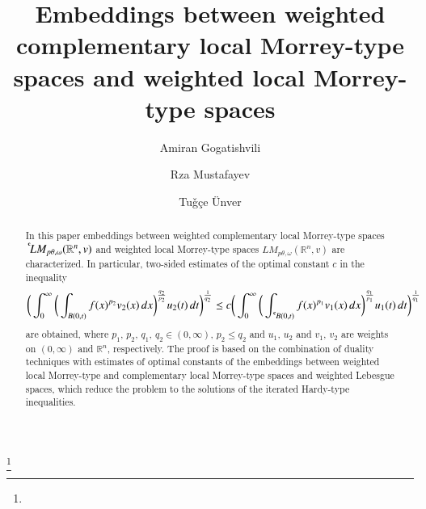 \documentclass[11pt]{amsart}
\theoremstyle{plain}
\theoremstyle{definition}
\numberwithin{thm}{section}
\numberwithin{equation}{section}
\begin{document}
\title[Embeddings between ${{\,^{^{\bf c}}\!}{LM_{p{\theta},{\omega}}({{\mathbb R}^n},v)}}$ and ${LM_{p{\theta},{\omega}}({{\mathbb R}^n},v)}$]{Embeddings between weighted complementary local Morrey-type spaces and weighted local Morrey-type spaces}

\author[A. Gogatishvili]{Amiran Gogatishvili}
\address{Institute of Mathematics \\
    Academy of Sciences of the Czech Republic \\
    \v Zitn\'a~25 \\
    115~67 Praha~1, Czech Republic} 

\author[R.Ch.Mustafayev]{Rza Mustafayev}
\address{Department of Mathematics \\ Faculty of Science and Arts \\ Kirikkale
    University \\ 71450 Yahsihan, Kirikkale, Turkey}

\author[T.~{\"U}nver]{Tu\v{g}\c{c}e {\"U}nver}
\address{Department of Mathematics \\ Faculty of Science and Arts \\ Kirikkale
    University \\ 71450 Yahsihan, Kirikkale, Turkey}

\thanks{}



\begin{abstract}
	In this paper embeddings between  weighted complementary local Morrey-type spaces ${\,^{^{\bf c}}\!}LM_{p\theta,\omega}({\mathbb R}^n,v)$ and  weighted local Morrey-type spaces $LM_{p\theta,\omega}({\mathbb R}^n,v)$ are characterized. In particular, two-sided estimates of the optimal constant $c$ in the inequality
	\begin{equation*}
	\bigg( \int_0^{\infty} \bigg( \int_{B(0,t)} f(x)^{p_2}v_2(x)\,dx \bigg)^{\frac{q_2}{p_2}} u_2(t)\,dt\bigg)^{\frac{1}{q_2}} \le c \bigg( \int_0^{\infty} \bigg( \int_{{\,^{^{\bf c}}\!}B(0,t)} f(x)^{p_1} v_1(x)\,dx\bigg)^{\frac{q_1}{p_1}} u_1(t)\,dt\bigg)^{\frac{1}{q_1}}
	\end{equation*}
	are obtained, where $p_1,\,p_2,\,q_1,\,q_2 \in (0,\infty)$, $p_2 \le q_2$ and $u_1,\,u_2$ and $v_1,\,v_2$ are weights on $(0,\infty)$ and ${\mathbb R}^n$, respectively. The proof is based on the combination of duality techniques with estimates of optimal constants of the embeddings between	weighted local Morrey-type and complementary local Morrey-type spaces and weighted Lebesgue spaces, which reduce the problem to the solutions of the iterated Hardy-type inequalities.
\end{abstract}
\end{document}
